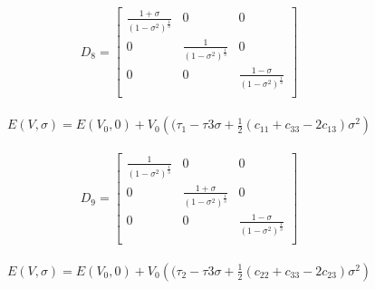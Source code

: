 \begin{center}
\begin{minipage}{.4\textwidth}
  \begin{equation}
    \begin{split}
      D_{8} = 
      \begin{bmatrix}
      \frac{1 + \sigma}{(1-\sigma^2)^{\frac{1}{3}}} & 0           & 0              \\
      0                                    & \frac{1}{(1-\sigma^2)^{\frac{1}{3}}}      &   0  \\
      0  &   0  & \frac{1-\sigma}{(1-\sigma^2)^{\frac{1}{3}}}       \\
      \end{bmatrix}
    \end{split}
  \label{eq:distortion8}
  \end{equation}
\end{minipage}
\begin{minipage}{.02\textwidth}
\end{minipage}
\begin{minipage}{.58\textwidth}
  \begin{equation}
    \begin{split}
    E(V,\sigma) = E(V_{0},0) + V_{0} \left((\tau_{1}-\tau{3} \sigma + \frac{1}{2} (c_{11} + c_{33} - 2 c_{13}) \sigma^2 \right)
    \end{split}
  \label{eq:distortion8energy}
  \end{equation}
\end{minipage}
\end{center}


\begin{center}
\begin{minipage}{.4\textwidth}
  \begin{equation}
    \begin{split}
      D_{9} = 
      \begin{bmatrix}
      \frac{1}{(1-\sigma^2)^{\frac{1}{3}}} & 0           & 0              \\
      0  & \frac{1 + \sigma}{(1-\sigma^2)^{\frac{1}{3}}}      &   0  \\
      0  &   0  & \frac{1 - \sigma}{(1-\sigma^2)^{\frac{1}{3}}}       \\
      \end{bmatrix}
    \end{split}
  \label{eq:distortion9}
  \end{equation}
\end{minipage}
\begin{minipage}{.02\textwidth}
\end{minipage}
\begin{minipage}{.58\textwidth}
  \begin{equation}
    \begin{split}
    E(V,\sigma) = E(V_{0},0) + V_{0} \left((\tau_{2}-\tau{3} \sigma + \frac{1}{2} (c_{22} + c_{33} - 2 c_{23}) \sigma^2 \right)
    \end{split}
  \label{eq:distortion9energy}
  \end{equation}
\end{minipage}
\end{center}


